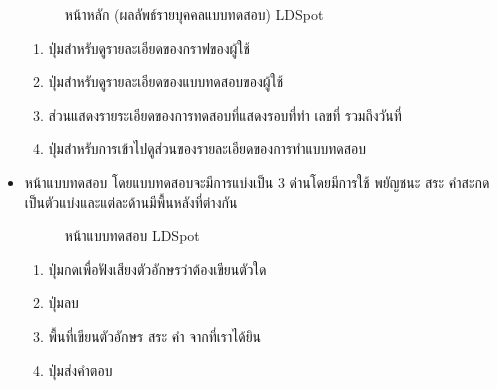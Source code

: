 \documentclass[12pt,oneside,openright,a4paper]{cpe-thai-project}
\begin{document}
\begin{itemize}
\begin{figure}[!ht]
    \caption{หน้าหลัก (ผลลัพธ์รายบุคคลแบบทดสอบ) LDSpot}\label{fig:endgame}
  \end{figure}
  \begin{enumerate}
    \item ปุ่มสำหรับดูรายละเอียดของกราฟของผู้ใช้
    \item ปุ่มสำหรับดูรายละเอียดของแบบทดสอบของผู้ใช้
    \item ส่วนแสดงรายระเอียดของการทดสอบที่แสดงรอบที่ทำ เลขที่ รวมถึงวันที่
    \item ปุ่มสำหรับการเข้าไปดูส่วนของรายละเอียดของการทำแบบทดสอบ
  \end{enumerate}
  \newpage
  \item หน้าแบบทดสอบ โดยแบบทดสอบจะมีการแบ่งเป็น 3 ด่านโดยมีการใช้ พยัญชนะ สระ คำสะกดเป็นตัวแบ่งและแต่ละด้านมีพื้นหลังที่ต่างกัน
    \begin{figure}[!ht]\centering
      \setlength{\fboxrule}{0.2mm} %
      \setlength{\fboxsep}{1cm}
      \caption{หน้าแบบทดสอบ LDSpot}\label{fig:result}
    \end{figure}
    \begin{enumerate}
      \item ปุ่มกดเพื่อฟังเสียงตัวอักษรว่าต้องเขียนตัวใด
      \item ปุ่มลบ
      \item พื้นที่เขียนตัวอักษร สระ คำ จากที่เราได้ยิน
      \item ปุ่มส่งคำตอบ
    \end{enumerate}
    \newpage


\end{itemize}
\end{document}
